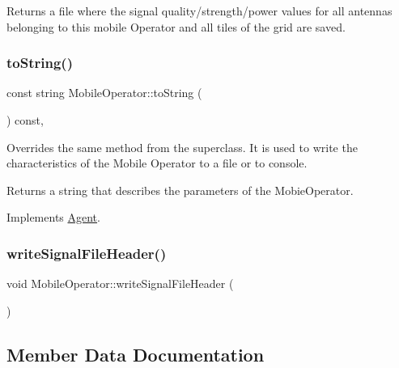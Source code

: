 \begin{DoxyReturn}{Returns}
a file where the signal quality/strength/power values for all antennas belonging to this mobile Operator and all tiles of the grid are saved. 
\end{DoxyReturn}
\mbox{\label{class_mobile_operator_aa83724a149499ef10678ad651a5b40df}} 
\subsubsection{\texorpdfstring{to\+String()}{toString()}}
{\footnotesize\ttfamily const string Mobile\+Operator\+::to\+String (\begin{DoxyParamCaption}{ }\end{DoxyParamCaption}) const\hspace{0.3cm}{\ttfamily [override]}, {\ttfamily [virtual]}}

Overrides the same method from the superclass. It is used to write the characteristics of the Mobile Operator to a file or to console. \begin{DoxyReturn}{Returns}
a string that describes the parameters of the Mobie\+Operator. 
\end{DoxyReturn}


Implements \hyperlink{class_agent_a44f291596d10c7878b0641d6ec156328}{Agent}.

\mbox{\label{class_mobile_operator_acbb238161ef223f7862e1ad19d2ede56}} 
\subsubsection{\texorpdfstring{write\+Signal\+File\+Header()}{writeSignalFileHeader()}}
{\footnotesize\ttfamily void Mobile\+Operator\+::write\+Signal\+File\+Header (\begin{DoxyParamCaption}{ }\end{DoxyParamCaption})}



\subsection{Member Data Documentation}
\mbox{\label{class_mobile_operator_abd11e27d3ed1273be761a55da1549fa4}} 
